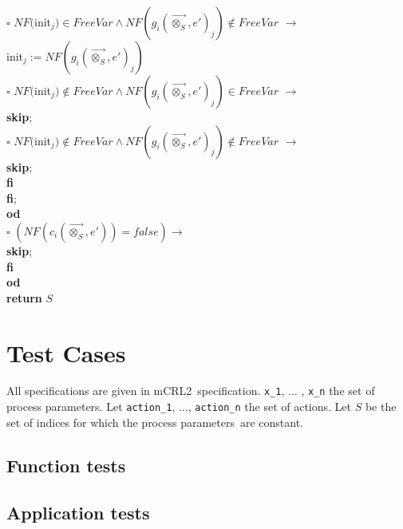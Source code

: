 \index{}\documentclass[a4paper,10pt]{article}
\theoremstyle{plain}
\theoremstyle{definition}
\newcommand{\ovr}{\overrightarrow}
\newcommand{\mcrl}{mCRL2}
\newcommand{\pps}{process parameters}
\newcommand{\tb}{\textbf}
\newcommand{\ra}{$\rightarrow$}
\newcommand{\sq}{$\square$}
\begin{document}
\begin{tabbing}
  \>	\>	\>	\>	\>	  \>	\>	\sq 	\> $NF($init$_j) \in FreeVar \wedge NF(g_i(\ovr{\otimes_S}, e')_j) \not\in FreeVar$ \ra \\
  \>	\>	\>	\>	\>	  \>	\>		\>	\>	init$_j := NF(g_i(\ovr{\otimes_S}, e')_j)$\\ 

  \>	\>	\>	\>	\>	  \>	\>	\sq 	\> $NF($init$_j) \not\in FreeVar \wedge NF(g_i(\ovr{\otimes_S}, e')_j) \in FreeVar$ \ra \\
  \>	\>	\>	\>	\>	  \>	\>		\>	\>	\tb{skip};\\ 

  \>	\>	\>	\>	\>	  \>	\>	\sq 	\> $NF($init$_j) \not\in FreeVar \wedge NF(g_i(\ovr{\otimes_S}, e')_j) \not\in FreeVar$ \ra \\
  \>	\>	\>	\>	\>	  \>	\>		\>	\>	\tb{skip};\\ 

 \>	\>	\>	\>	\>	\>	\>	\tb{fi}	\\
  \>	\>	\> 	\> 	\>          \tb{fi}; \\
  \>	\>	\>	\> \tb{od}\\
  \>	\>	\sq 	\>  $(NF(c_i(\ovr{\otimes_S},e')) = false) \rightarrow$ \\
  \>	\>	\> 	\>\tb{skip};\\
  \>	\>	\tb{fi}\\
  \>	\tb{od} \\
 \tb{return} $S$
\end{tabbing} 
\newpage

\section{Test Cases}
All specifications are given in \mcrl\ specification.
\verb"x_1", $\ldots$ , \verb"x_n" the set of process parameters.
Let \verb"action_1", $\ldots$, \verb "action_n" the set of actions.
Let $S$ be the set of indices for which the \pps\ are constant. 

\subsection{Function tests}

\subsection{Application tests}
\end{document}
